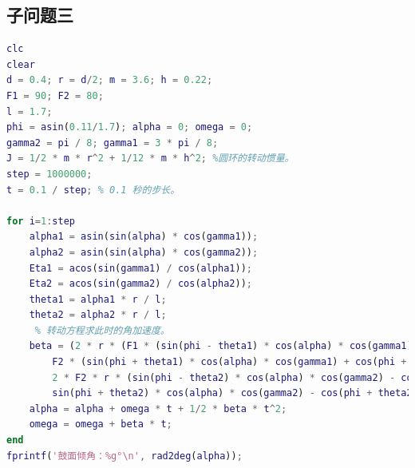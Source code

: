\documentclass{cumcm}
\begin{document}
\subsection{子问题三}
\begin{lstlisting}[language=matlab]
clc
clear
d = 0.4; r = d/2; m = 3.6; h = 0.22;
F1 = 90; F2 = 80;
l = 1.7;
phi = asin(0.11/1.7); alpha = 0; omega = 0;
gamma2 = pi / 8; gamma1 = 3 * pi / 8;
J = 1/2 * m * r^2 + 1/12 * m * h^2; %圆环的转动惯量。
step = 1000000;
t = 0.1 / step; % 0.1 秒的步长。

for i=1:step
    alpha1 = asin(sin(alpha) * cos(gamma1));
    alpha2 = asin(sin(alpha) * cos(gamma2));
    Eta1 = acos(sin(gamma1) / cos(alpha1));
    Eta2 = acos(sin(gamma2) / cos(alpha2));
    theta1 = alpha1 * r / l;
    theta2 = alpha2 * r / l;
     % 转动方程求此时的角加速度。
    beta = (2 * r * (F1 * (sin(phi - theta1) * cos(alpha) * cos(gamma1) - cos(phi - theta1) * sin(alpha1) * sin(Eta1)) - ...
        F2 * (sin(phi + theta1) * cos(alpha) * cos(gamma1) + cos(phi + theta1) * sin(alpha1) * sin(Eta1))) + ...
        2 * F2 * r * (sin(phi - theta2) * cos(alpha) * cos(gamma2) - cos(phi - theta2) * sin(alpha2) * sin(Eta2) - ...
        sin(phi + theta2) * cos(alpha) * cos(gamma2) - cos(phi + theta2) * sin(alpha2) * sin(Eta2))) / J;
    alpha = alpha + omega * t + 1/2 * beta * t^2;
    omega = omega + beta * t;
end
fprintf('鼓面倾角：%g°\n', rad2deg(alpha));
\end{lstlisting}
\end{document}

